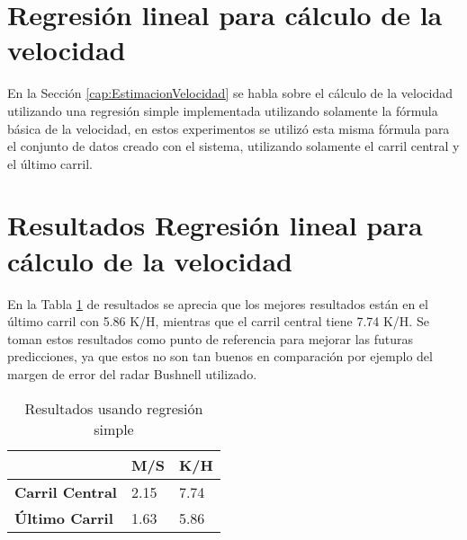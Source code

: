 \section{Regresión lineal para cálculo de la velocidad}

En la Sección \ref{cap:EstimacionVelocidad} se habla sobre el cálculo de la velocidad utilizando una regresión simple implementada utilizando solamente la fórmula básica de la velocidad, en estos experimentos se utilizó esta misma fórmula para el conjunto de datos creado con el sistema, utilizando solamente el carril central y el último carril.

\section{Resultados Regresión lineal para cálculo de la velocidad}

En la Tabla \ref{tab:resultadosRLS} de resultados se aprecia que los mejores resultados están en el último carril con 5.86 K/H, mientras que el carril central tiene 7.74 K/H. Se toman estos resultados como punto de referencia para mejorar las futuras predicciones, ya que estos no son tan buenos en comparación por ejemplo del margen de error del radar Bushnell utilizado.

\begin{table}[H]
    \centering
    \caption{Resultados usando regresión simple}
    \label{tab:resultadosRLS}
    \begin{tabular}{|l|l|l|}
    \hline
    \textbf{} & \textbf{M/S} & \textbf{K/H} \\ \hline
    \textbf{Carril Central} & 2.15 & 7.74 \\ \hline
    \textbf{Último Carril}  & 1.63 & 5.86 \\ \hline
    \end{tabular}
\end{table}
